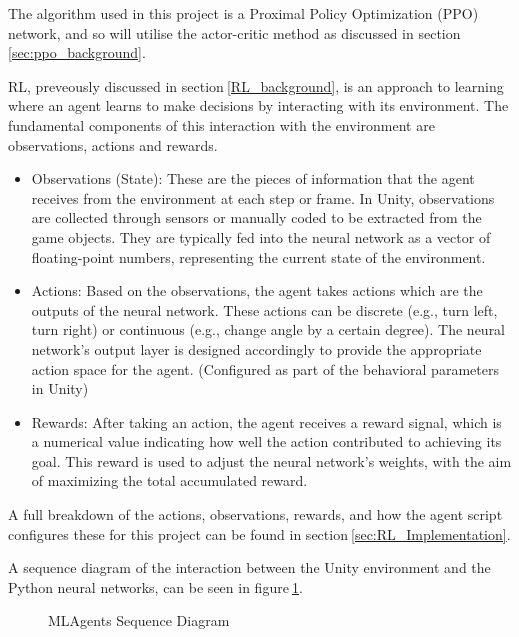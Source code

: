 The algorithm used in this project is a Proximal Policy Optimization (PPO) network, and so will utilise the actor-critic method as discussed in section$~$\ref{sec:ppo_background}.

RL, preveously discussed in section$~$\ref{RL_background}, is an approach to learning where an agent learns to make decisions by interacting with its environment. The fundamental components of this interaction with the environment are observations, actions and rewards.
\begin{itemize}
    \item Observations (State): These are the pieces of information that the agent receives from the environment at each step or frame. In Unity, observations are collected through sensors or manually coded to be extracted from the game objects. They are typically fed into the neural network as a vector of floating-point numbers, representing the current state of the environment.
    \item Actions: Based on the observations, the agent takes actions which are the outputs of the neural network. These actions can be discrete (e.g., turn left, turn right) or continuous (e.g., change angle by a certain degree). The neural network's output layer is designed accordingly to provide the appropriate action space for the agent. (Configured as part of the behavioral parameters in Unity)
    \item Rewards: After taking an action, the agent receives a reward signal, which is a numerical value indicating how well the action contributed to achieving its goal. This reward is used to adjust the neural network's weights, with the aim of maximizing the total accumulated reward.
\end{itemize}
A full breakdown of the actions, observations, rewards, and how the agent script configures these for this project can be found in section$~$\ref{sec:RL_Implementation}.

A sequence diagram of the interaction between the Unity environment and the Python neural networks, can be seen in figure$~$\ref{MLAgents_Seq_Diagram}.

\begin{figure}[h]
    \centering
    \caption{MLAgents Sequence Diagram}\label{MLAgents_Seq_Diagram}
\end{figure}

